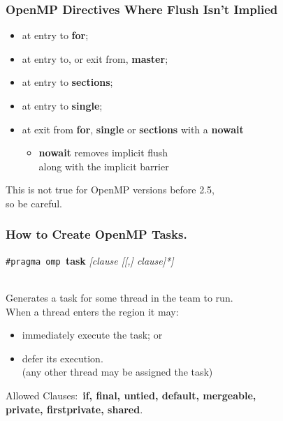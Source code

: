 \begin{frame} 
  \frametitle{OpenMP Directives Where Flush Isn't Implied}

\begin{changemargin}{2cm}
\large
  \begin{itemize}
    \item at entry to {\bf for};
    \item at entry to, or exit from, {\bf master};
    \item at entry to {\bf sections}; 
    \item at entry to {\bf single};
    \item at exit from {\bf for}, {\bf single} or {\bf sections} with a {\bf nowait}
      \begin{itemize}
        \item {\bf nowait} removes implicit flush\\
 along with the implicit barrier
      \end{itemize}
  \end{itemize}

  This is not true for OpenMP versions before 2.5,\\
 so be careful.
\end{changemargin}

\end{frame}

\begin{frame}
  \frametitle{How to Create OpenMP Tasks.}

  
\begin{changemargin}{1cm}
\large
  \begin{center}
    {\tt \#pragma omp }{\bf task} {\it [clause [[,] clause]*]}
  \end{center}~\\

     Generates a task for some thread in the team to run.\\[1em]
     When a thread enters the region it may:
      \begin{itemize}
        \item immediately execute the task; or
        \item defer its execution.\\\qquad  (any other thread may be assigned the task)
      \end{itemize}

\begin{tabbing}
  Allowed Clauses:~\= 
{\bf if, final, untied, default, mergeable,}\\
\> {\bf private, firstprivate, shared}.
\end{tabbing}
\end{changemargin}

\end{frame}

